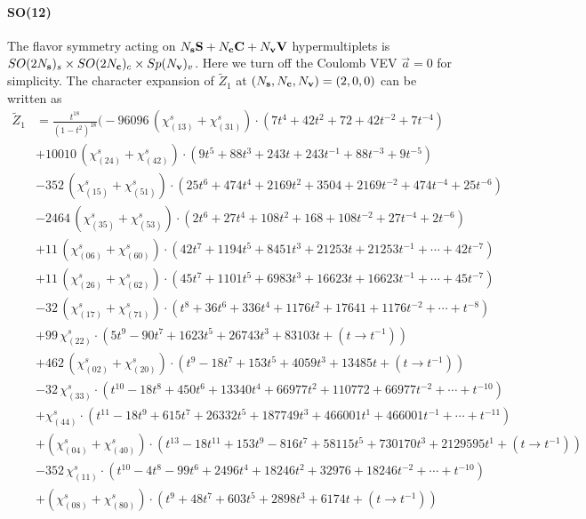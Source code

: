 \documentclass[letterpaper, 11pt]{article}
\newcommand{\nn}{\nonumber}
\begin{document}
{\paragraph{SO(12)} 
The flavor symmetry acting on $N_{\bf s} \mathbf{S} +N_{\bf c} \mathbf{C} + N_{\bf v} \mathbf{V}$ hypermultiplets is $SO(2N_{\bf s})_s \times SO(2N_{\bf c})_c \times  Sp(N_{\bf v})_v$. Here we turn off the Coulomb VEV $\vec{a} = 0$ for simplicity. The character expansion of  $\tilde{Z}_1$ at $(N_{\bf s},N_{\bf c}, N_{\bf v}) = (2,0,0)$ can be written as
\begin{align}
  \label{eq:so12-s2}
  \tilde{Z}_1&= \frac{t^{18}}{(1-t^2)^{18}}\Big(
  -96096\, (\chi^s_{(13)}+\chi^s_{(31)})\cdot {(7t^4+42t^2+72+42t^{-2}+7t^{-4})}\\
  &+10010\,(\chi^s_{(24)}+\chi^s_{(42)})\cdot {(9t^5+88t^3+243t+243t^{-1}+88t^{-3}+9t^{-5})}\nn\\
  &-352\,(\chi^s_{(15)}+\chi^s_{(51)})\cdot {(25t^6+474t^4+2169t^2+3504+2169t^{-2}+474t^{-4}+25t^{-6})}\nn\\
  &-2464\,(\chi^s_{(35)}+\chi^s_{(53)})\cdot {(2t^6+27t^4+108t^2+168+108t^{-2}+27t^{-4}+2t^{-6})}\nn\\
  &+11\,(\chi^s_{(06)}+\chi^s_{(60)})\cdot {(42t^7+1194t^5+8451t^3+21253t+21253t^{-1}+\cdots+42t^{-7})}\nn\\
  &+11\,(\chi^s_{(26)}+\chi^s_{(62)})\cdot (45t^7+1101t^5+6983t^3+16623t+16623t^{-1} + \cdots + 45t^{-7})\nn\\
  &-32\,(\chi^s_{(17)}+\chi^s_{(71)})\cdot (t^8+36t^6+336t^4+1176t^2+17641+1176t^{-2}+\cdots+t^{-8})\nn\\
  &+99\,\chi^s_{(22)}\cdot {(5t^9-90t^7+1623t^5+26743t^3+83103t+ (t\rightarrow t^{-1}))}\nn\\
  &+462\,(\chi^s_{(02)}+\chi^s_{(20)})\cdot {(t^{9}-18t^7+153t^5+4059t^3+13485t+ (t\rightarrow t^{-1}))}\nn\\
  &-32\,\chi^s_{(33)}\cdot {(t^{10}-18t^8+450t^6+13340t^4+66977t^2+110772+66977t^{-2}+\cdots+t^{-10})}\nn\\
  &+\chi^s_{(44)}\cdot {(t^{11}-18t^9+615t^7+26332t^5+187749t^3+466001t^{1}+466001t^{-1}+\cdots+t^{-11})}\nn\\
  &+(\chi^s_{(04)}+\chi^s_{(40)})\cdot (t^{13}-18t^{11}+153t^9-816t^7+58115t^5+730170t^{3}+2129595t^{1}+(t\rightarrow t^{-1}))\nn\\
  &-352\,\chi^s_{(11)}\cdot{(t^{10}-4t^8-99t^6+2496t^4+18246t^2+32976+18246t^{-2}+\cdots+t^{-10})}\nn\\
  &+(\chi^s_{(08)}+\chi^s_{(80)})\cdot {(t^9+48t^7+603t^5+2898t^3+6174t+(t\rightarrow t^{-1}))}\nn\\

\end{align}}
\end{document}
